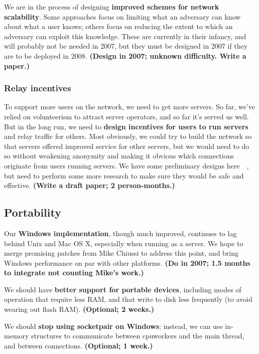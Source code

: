 \documentclass{article}
\newcommand{\plan}[1]{ {\bf (#1)}}
\begin{document}
We are in the process of designing {\bf improved schemes for network
  scalability}.  Some approaches focus on limiting what an adversary can know
about what a user knows; others focus on reducing the extent to which an
adversary can exploit this knowledge.  These are currently in their infancy,
and will probably not be needed in 2007, but they must be designed in 2007 if
they are to be deployed in 2008.\plan{Design in 2007; unknown difficulty.
  Write a paper.}

\subsubsection{Relay incentives}
To support more users on the network, we need to get more servers.  So far,
we've relied on volunteerism to attract server operators, and so far it's
served us well.  But in the long run, we need to {\bf design incentives for
  users to run servers} and relay traffic for others.  Most obviously, we
could try to build the network so that servers offered improved service for
other servers, but we would need to do so without weakening anonymity and
making it obvious which connections originate from users running servers.  We
have some preliminary designs here~\cite{tor-challenges}~\cite{incentives-txt},
but need to perform
some more research to make sure they would be safe and effective.\plan{Write
  a draft paper; 2 person-months.}

\subsection{Portability}
Our {\bf Windows implementation}, though much improved, continues to lag
behind Unix and Mac OS X, especially when running as a server.  We hope to
merge promising patches from Mike Chiussi to address this point, and bring
Windows performance on par with other platforms.\plan{Do in 2007; 1.5 months
  to integrate not counting Mike's work.}

We should have {\bf better support for portable devices}, including modes of
operation that require less RAM, and that write to disk less frequently (to
avoid wearing out flash RAM).\plan{Optional; 2 weeks.}

We should {\bf stop using socketpair on Windows}; instead, we can use
in-memory structures to communicate between cpuworkers and the main thread,
and between connections.\plan{Optional; 1 week.}
\end{document}
